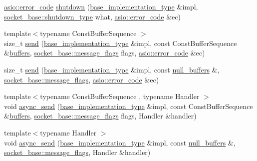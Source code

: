 \begin{DoxyCompactItemize}
\item 
\hyperlink{classasio_1_1error__code}{asio\+::error\+\_\+code} \hyperlink{classasio_1_1detail_1_1reactive__socket__service__base_a4bc8a54b04e35fe393fba4c3ba46ae4e}{shutdown} (\hyperlink{structasio_1_1detail_1_1reactive__socket__service__base_1_1base__implementation__type}{base\+\_\+implementation\+\_\+type} \&impl, \hyperlink{classasio_1_1socket__base_a915e52ff147efd296350bba81f795c37}{socket\+\_\+base\+::shutdown\+\_\+type} what, \hyperlink{classasio_1_1error__code}{asio\+::error\+\_\+code} \&ec)
\item 
{\footnotesize template$<$typename Const\+Buffer\+Sequence $>$ }\\size\+\_\+t \hyperlink{classasio_1_1detail_1_1reactive__socket__service__base_a802d4d18c1e516d4f68e03a0acb3aa68}{send} (\hyperlink{structasio_1_1detail_1_1reactive__socket__service__base_1_1base__implementation__type}{base\+\_\+implementation\+\_\+type} \&impl, const Const\+Buffer\+Sequence \&\hyperlink{group__async__read_ga54dede45c3175148a77fe6635222c47d}{buffers}, \hyperlink{classasio_1_1socket__base_ac3cf77465dfedfe1979b5415cf32cc94}{socket\+\_\+base\+::message\+\_\+flags} flags, \hyperlink{classasio_1_1error__code}{asio\+::error\+\_\+code} \&ec)
\item 
size\+\_\+t \hyperlink{classasio_1_1detail_1_1reactive__socket__service__base_aab5d919bb2f0a68c33a6ff71dbf74c07}{send} (\hyperlink{structasio_1_1detail_1_1reactive__socket__service__base_1_1base__implementation__type}{base\+\_\+implementation\+\_\+type} \&impl, const \hyperlink{classasio_1_1null__buffers}{null\+\_\+buffers} \&, \hyperlink{classasio_1_1socket__base_ac3cf77465dfedfe1979b5415cf32cc94}{socket\+\_\+base\+::message\+\_\+flags}, \hyperlink{classasio_1_1error__code}{asio\+::error\+\_\+code} \&ec)
\item 
{\footnotesize template$<$typename Const\+Buffer\+Sequence , typename Handler $>$ }\\void \hyperlink{classasio_1_1detail_1_1reactive__socket__service__base_a0475de2224623da1c4666a79fddfa43c}{async\+\_\+send} (\hyperlink{structasio_1_1detail_1_1reactive__socket__service__base_1_1base__implementation__type}{base\+\_\+implementation\+\_\+type} \&impl, const Const\+Buffer\+Sequence \&\hyperlink{group__async__read_ga54dede45c3175148a77fe6635222c47d}{buffers}, \hyperlink{classasio_1_1socket__base_ac3cf77465dfedfe1979b5415cf32cc94}{socket\+\_\+base\+::message\+\_\+flags} flags, Handler \&handler)
\item 
{\footnotesize template$<$typename Handler $>$ }\\void \hyperlink{classasio_1_1detail_1_1reactive__socket__service__base_a304bda34f88f0854bef33b236fd38846}{async\+\_\+send} (\hyperlink{structasio_1_1detail_1_1reactive__socket__service__base_1_1base__implementation__type}{base\+\_\+implementation\+\_\+type} \&impl, const \hyperlink{classasio_1_1null__buffers}{null\+\_\+buffers} \&, \hyperlink{classasio_1_1socket__base_ac3cf77465dfedfe1979b5415cf32cc94}{socket\+\_\+base\+::message\+\_\+flags}, Handler \&handler)

\end{DoxyCompactItemize}
